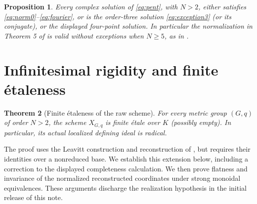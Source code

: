 \documentclass[11pt]{article}
\newtheorem{theorem}{Theorem}[section]
\newtheorem{proposition}[theorem]{Proposition}
\theoremstyle{remark}
\begin{document}
\begin{proposition}\label{prop:alternative}
Every complex solution of \eqref{eq:pent}, with $N>2$, either satisfies
\eqref{eq:norm0}--\eqref{eq:fourier}, or is the order-three solution
\eqref{eq:exception3} (or its conjugate), or the displayed four-point
solution. In particular the normalization in Theorem 5 of \cite{RW} is valid
without exceptions when $N\ge5$, as in \cite[Theorem~5]{RW2}.
\end{proposition}

\section{Infinitesimal rigidity and finite \'{e}taleness}
\label{sec:rigidity}

\begin{theorem}[Finite \'{e}taleness of the raw scheme]\label{thm:etale}
For every metric group $(G,q)$ of order $N>2$, the scheme $X_{G,q}$ is
finite \'{e}tale over $K$ (possibly empty). In particular, its actual
localized defining ideal is radical.
\end{theorem}

The proof uses the Leavitt construction and reconstruction of
\cite[Sections~5.4--5.5 and Appendix~B]{RW2}, but requires their identities
over a nonreduced base. We establish this extension below, including a
correction to the displayed completeness calculation. We then prove
flatness and invariance of the normalized reconstructed coordinates under
strong monoidal equivalences. These arguments discharge the realization
hypothesis in the initial release of this note.
\end{document}
